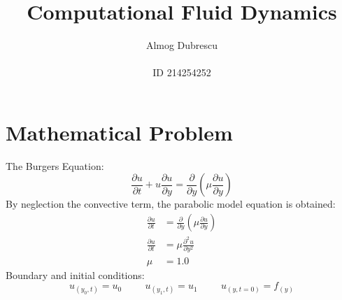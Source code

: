 \documentclass[11pt, a4paper]{article}
\title{Computational Fluid Dynamics}
\author{Almog Dubrescu\\\\ID 214254252}
\begin{document}
\maketitle

\thispagestyle{empty}
\newpage
\setcounter{page}{1}

\tableofcontents
\newpage

\section{Mathematical Problem}
The Burgers Equation:
\begin{equation}
    \frac{\partial u}{\partial t} + u\frac{\partial u}{\partial y} = \frac{\partial}{\partial y}\left(\mu\frac{\partial u}{\partial y}\right)
\end{equation}
By neglection the convective term, the parabolic model equation is obtained:
\begin{align}
    \frac{\partial u}{\partial t} &= \frac{\partial}{\partial y}\left(\mu\frac{\partial u}{\partial y}\right)\\
    \frac{\partial u}{\partial t} &= \mu\frac{\partial^2 u}{\partial y^2}\\
    \mu &= 1.0
\end{align}
Boundary and initial conditions:
\begin{equation}
    u_{(y_0, t)} = u_0 \hspace{1cm} u_{(y_1, t)} = u_1 \hspace{1cm} u_{(y, t=0)} = f_{(y)}
\end{equation}
\end{document}
